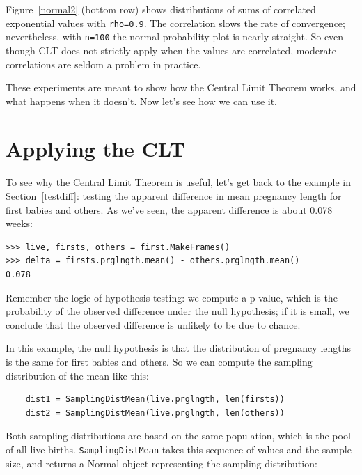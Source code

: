 \documentclass[12pt]{book}
\begin{document}
Figure~\ref{normal2} (bottom row) shows distributions of sums of
correlated exponential values with {\tt rho=0.9}.  The correlation
slows the rate of convergence; nevertheless, with {\tt n=100} the
normal probability plot is nearly straight.  So even though CLT
does not strictly apply when the values are correlated, moderate
correlations are seldom a problem in practice.

These experiments are meant to show how the Central Limit Theorem
works, and what happens when it doesn't.  Now let's see how we can
use it.


\section{Applying the CLT}
\label{usingCLT}

To see why the Central Limit Theorem is useful, let's get back
to the example in Section~\ref{testdiff}: testing the apparent
difference in mean pregnancy length for first babies and others.
As we've seen, the apparent difference is about
0.078 weeks:

\begin{verbatim}
>>> live, firsts, others = first.MakeFrames()
>>> delta = firsts.prglngth.mean() - others.prglngth.mean()
0.078
\end{verbatim}

Remember the logic of hypothesis testing: we compute a p-value, which
is the probability of the observed difference under the null
hypothesis; if it is small, we conclude that the observed difference
is unlikely to be due to chance.

In this example, the null hypothesis is that the distribution of
pregnancy lengths is the same for first babies and others.  
So we can compute the sampling distribution of the mean
like this:

\begin{verbatim}
    dist1 = SamplingDistMean(live.prglngth, len(firsts))
    dist2 = SamplingDistMean(live.prglngth, len(others))
\end{verbatim}

Both sampling distributions are based on the same population, which is
the pool of all live births.  {\tt SamplingDistMean} takes this
sequence of values and the sample size, and returns a Normal object
representing the sampling distribution:
\end{document}

